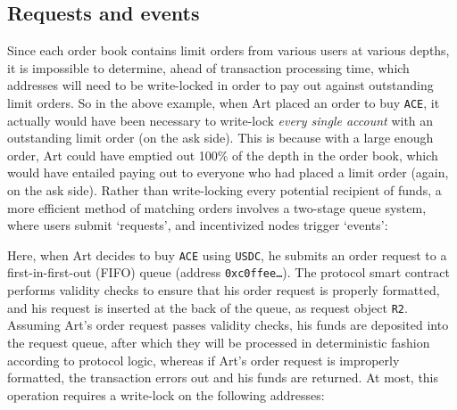 \documentclass{scrartcl}
\begin{document}
\subsection{Requests and events}

Since each order book contains limit orders from various users at various depths, it is impossible to determine, ahead of transaction processing time, which addresses will need to be write-locked in order to pay out against outstanding limit orders.
So in the above example, when Art placed an order to buy \texttt{ACE}, it actually would have been necessary to write-lock \emph{every single account} with an outstanding limit order (on the ask side).
This is because with a large enough order, Art could have emptied out 100\% of the depth in the order book, which would have entailed paying out to everyone who had placed a limit order (again, on the ask side).
Rather than write-locking every potential recipient of funds, a more efficient method of matching orders involves a two-stage queue system, where users submit `requests', and incentivized nodes trigger `events':

\begin{center}
\end{center}

Here, when Art decides to buy \texttt{ACE} using \texttt{USDC}, he submits an order request to a first-in-first-out (FIFO) queue (address \texttt{0xc0ffee\ldots}).
The protocol smart contract performs validity checks to ensure that his order request is properly formatted, and his request is inserted at the back of the queue, as request object \texttt{R2}.
Assuming Art's order request passes validity checks, his funds are deposited into the request queue, after which they will be processed in deterministic fashion according to protocol logic, whereas if Art's order request is improperly formatted, the transaction errors out and his funds are returned.
At most, this operation requires a write-lock on the following addresses:
\end{document}
